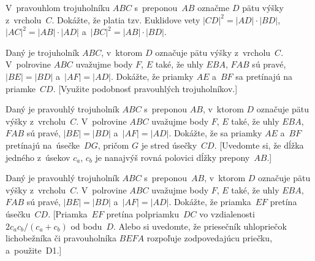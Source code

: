 {
V~pravouhlom trojuholníku $ABC$ s~preponou~$AB$ označme $D$ pätu výšky
z~vrcholu~$C$. Dokážte, že platia tzv. Euklidove vety
$|CD|^2 = |AD|\cdot|BD|$, $|AC|^2 = |AB|\cdot|AD|$ a~$|BC|^2 = |AB|\cdot|BD|$.

Daný je trojuholník $ABC$, v~ktorom $D$ označuje pätu výšky
z~vrcholu~$C$. V~polrovine $ABC$
uvažujme body $F$, $E$ také, že uhly $EBA$, $FAB$ sú pravé, $|BE| = |BD|$
a~$|AF| = |AD|$. Dokážte, že priamky $AE$ a~$BF$ sa pretínajú na priamke~$CD$. [Využite podobnosť pravouhlých trojuholníkov.]

\D
Daný je pravouhlý trojuholník $ABC$ s~preponou $AB$, v~ktorom $D$
označuje pätu výšky z~vrcholu~$C$. V~polrovine
$ABC$ uvažujme body $F$, $E$ také, že uhly $EBA$,
$FAB$ sú pravé, $|BE| = |BD|$ a~$|AF| = |AD|$. Dokážte, že
sa priamky $AE$ a~$BF$ pretínajú
na~úsečke~$DG$, pričom $G$ je stred úsečky~$CD$.
[Uvedomte si, že dĺžka jedného z~úsekov $c_a$, $c_b$ je nanajvýš rovná polovici
dĺžky prepony~$AB$.]

Daný je pravouhlý trojuholník $ABC$ s~preponou~$AB$, v~ktorom $D$
označuje pätu výšky z~vrcholu~$C$. V~polrovine
$ABC$ uvažujme body $F$, $E$ také, že uhly $EBA$,
$FAB$ sú pravé, $|BE| = |BD|$ a~$|AF| = |AD|$. Dokážte, že priamka~$EF$
pretína úsečku~$CD$. [Priamka~$EF$ pretína polpriamku~$DC$ vo
vzdialenosti $2c_ac_b / (c_a+c_b)$ od bodu~$D$.
Alebo si uvedomte, že priesečník uhlopriečok lichobežníka či pravouholníka
$BEFA$ rozpoľuje zodpovedajúcu priečku, a~použite~D1.]
}

